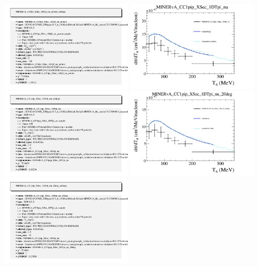 \documentclass{article}
\begin{document}
\includegraphics[width=0.49\textwidth]{figures/nuisance_MINERvA_CC0pi_XSec_1DQ2_nu_proton_info.png}
\centering
\includegraphics[width=0.49\textwidth]{figures/nuisance_MINERvA_CC1pip_XSec_1DTpi_nu_comp.png}
\includegraphics[width=0.49\textwidth]{figures/nuisance_MINERvA_CC1pip_XSec_1DTpi_nu_info.png}
\centering
\includegraphics[width=0.49\textwidth]{figures/nuisance_MINERvA_CC1pip_XSec_1DTpi_nu_20deg_comp.png}
\includegraphics[width=0.49\textwidth]{figures/nuisance_MINERvA_CC1pip_XSec_1DTpi_nu_20deg_info.png}
\end{document}
